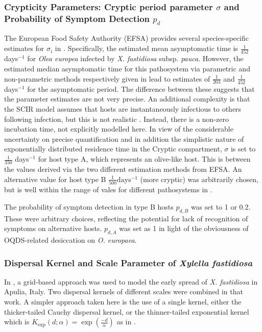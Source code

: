 \documentclass[11pt,letterpaper]{article}
\begin{document}
\subsubsection*{Crypticity Parameters: Cryptic period parameter $\sigma$ and Probability of Symptom Detection $p_{d}$}
  The European Food Safety Authority (EFSA) provides several species-specific estimates for $\sigma_{i}$ in \cite{Bragard2019}. Specifically, the estimated mean asymptomatic time is $\frac{1}{452}$ days$^{-1}$ for \emph{Olea europea} infected by \emph{X. fastidiosa} subsp. \emph{pauca}. However, the estimated median asymptomatic time for this pathosystem via parametric and non-parametric methods respectively given in \cite{Bragard2019} lead to estimates of $\frac{1}{203}$ and $\frac{1}{452}$ days$^{-1}$ for the asymptomatic period. The difference between these suggests that the parameter estimates are not very precise. An additional complexity is that the SCIR model assumes that hosts are instantaneously infectious to others following infection, but this is not realistic \cite{Leclerc2014}. Instead, there is a non-zero incubation time, not explicitly modelled here. In view of the considerable uncertainty on precise quantification and in addition the simplistic nature of exponentially distributed residence time in the Cryptic compartment, $\sigma$ is set to $\frac{1}{350}$  days$^{-1}$ for host type A, which represents an olive-like host. This is between the values derived via the two different estimation methods from EFSA.
  An alternative value for host type B  $\frac{1}{500} \mathrm{days^{-1}}$ (more cryptic)  was arbitrarily chosen, but is well within the range of vales for different pathosystems in \cite{Bragard2019}.
  
  The probability of symptom detection in type B hosts $p_{d, B}$ was set to 1 or 0.2. These were arbitrary choices, reflecting the potential for lack of recognition of symptoms on alternative hosts. $p_{d,A}$ was set as 1 in light of the obviousness of OQDS-related desiccation on \emph{O. europaea}. 
  
\FloatBarrier
\subsubsection*{Dispersal Kernel and Scale Parameter of \emph{Xylella fastidiosa}}

In \cite{White2017}, a grid-based approach was used to model the early spread of \emph{X. fastidiosa} in Apulia, Italy. Two dispersal kernels of different scales were combined in that work. A simpler approach taken here is the use of a single kernel, either the thicker-tailed Cauchy dispersal kernel, or the thinner-tailed exponential kernel which is $K_{\exp}(d; \alpha) = \exp\left(\frac{-d}{\alpha}\right)$ as in \cite{HyattTwynam2017}. 
\end{document}
